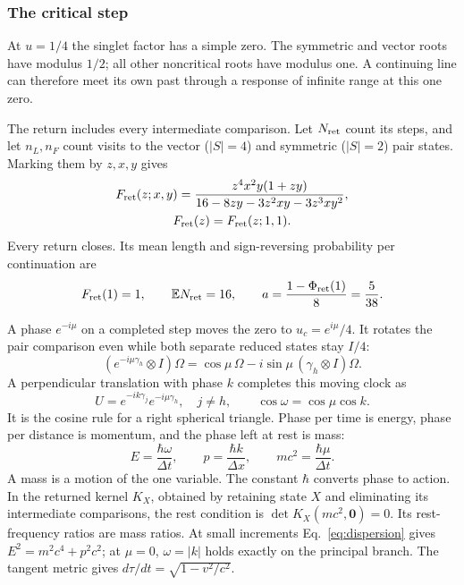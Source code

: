 \documentclass[aps,prx,reprint,longbibliography]{revtex4-2}
\providecommand{\Phis}{\Phi_{\rm ret}}
\providecommand{\E}{\mathbb E}
\providecommand{\Fret}{F_{\rm ret}}
\begin{document}
\subsubsection{The critical step}
\label{sec:critical}

At $u=1/4$ the singlet factor has a simple zero. The symmetric and vector roots have modulus $1/2$; all other noncritical roots have modulus one. A continuing line can therefore meet its own past through a response of infinite range at this one zero.

The return includes every intermediate comparison. Let $N_{\rm ret}$ count its steps, and let $n_L,n_F$ count visits to the vector ($|S|=4$) and symmetric ($|S|=2$) pair states. Marking them by $z,x,y$ gives
\begin{equation}
\begin{gathered}
 \Fret(z;x,y)=\frac{z^4x^2y(1+zy)}{16-8zy-3z^2xy-3z^3xy^2},\\
 \Fret(z)=\Fret(z;1,1).
 \end{gathered}
 \label{eq:returns}
\end{equation}
Every return closes. Its mean length and sign-reversing probability per continuation are
\begin{equation}
 \Fret(1)=1,\qquad \E N_{\rm ret}=16,\qquad
 a=\frac{1-\Phis(1)}8=\frac5{38}.
 \label{eq:return_numbers}
\end{equation}

A phase $e^{-i\mu}$ on a completed step moves the zero to $u_c=e^{i\mu}/4$. It rotates the pair comparison even while both separate reduced states stay $I/4$:
\begin{equation}
 (e^{-i\mu\gamma_h}\otimes I)\Omega
 =\cos\mu\,\Omega-i\sin\mu\,(\gamma_h\otimes I)\Omega.
 \label{eq:joint_clock}
\end{equation}
A perpendicular translation with phase $k$ completes this moving clock as
\begin{equation}
 U=e^{-ik\gamma_j}e^{-i\mu\gamma_h},\quad j\ne h,
 \qquad\boxed{\cos\omega=\cos\mu\cos k}.
 \label{eq:dispersion}
\end{equation}
It is the cosine rule for a right spherical triangle. Phase per time is energy, phase per distance is momentum, and the phase left at rest is mass:
\begin{equation}
 E=\frac{\hbar\omega}{\Delta t},\qquad
 p=\frac{\hbar k}{\Delta x},\qquad
 mc^2=\frac{\hbar\mu}{\Delta t}.
 \label{eq:physical_phase}
\end{equation}
A mass is a motion of the one variable. The constant $\hbar$ converts phase to action. In the returned kernel $K_X$, obtained by retaining state $X$ and eliminating its intermediate comparisons, the rest condition is $\det K_X(mc^2,\mathbf0)=0$. Its rest-frequency ratios are mass ratios. At small increments Eq.~\eqref{eq:dispersion} gives $E^2=m^2c^4+p^2c^2$; at $\mu=0$, $\omega=|k|$ holds exactly on the principal branch. The tangent metric gives $d\tau/dt=\sqrt{1-v^2/c^2}$.
\end{document}

